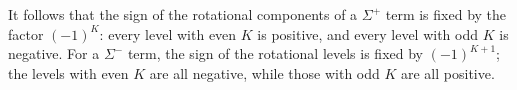 It follows that the sign of the rotational components of a $\Sigma^+$ term is fixed by the factor $(-1)^K$: every level with even $K$ is positive, and every level with odd $K$ is negative. For a $\Sigma^-$ term, the sign of the rotational levels is fixed by $(-1)^{K+1}$; the levels with even $K$ are all negative, while those with odd $K$ are all positive.
